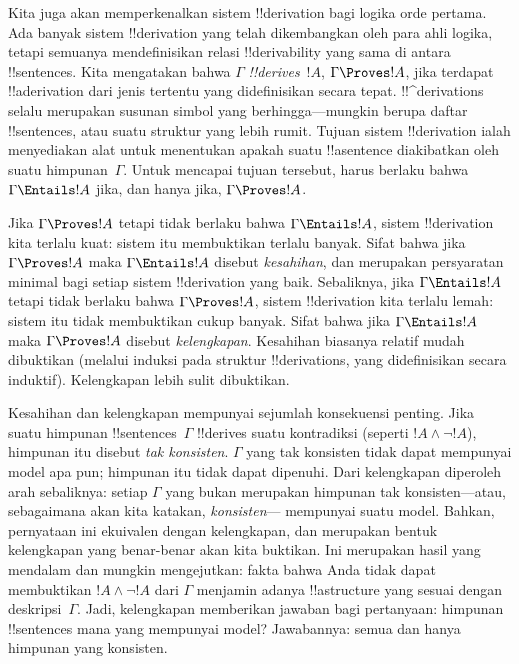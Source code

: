 \documentclass[../../../include/open-logic-section]{subfiles}
\begin{document}


Kita juga akan memperkenalkan sistem !!{derivation} bagi logika orde pertama.
Ada banyak sistem !!{derivation} yang telah dikembangkan oleh para ahli
logika, tetapi semuanya mendefinisikan relasi !!{derivability} yang sama di
antara !!{sentence}s. Kita mengatakan bahwa $\Gamma$ \emph{!!{derive}s}~$!A$,
$\Gamma \Proves !A$, jika terdapat !!a{derivation} dari jenis tertentu yang
didefinisikan secara tepat. !!^{derivation}s selalu merupakan susunan simbol
yang berhingga---mungkin berupa daftar !!{sentence}s, atau suatu struktur yang
lebih rumit. Tujuan sistem !!{derivation} ialah menyediakan alat untuk
menentukan apakah suatu !!a{sentence} diakibatkan oleh suatu himpunan~$\Gamma$.
Untuk mencapai tujuan tersebut, harus berlaku bahwa $\Gamma
\Entails !A$ jika, dan hanya jika, $\Gamma \Proves !A$.

Jika $\Gamma \Proves !A$ tetapi tidak berlaku bahwa $\Gamma \Entails !A$,
sistem !!{derivation} kita terlalu kuat: sistem itu membuktikan terlalu
banyak. Sifat bahwa jika $\Gamma \Proves !A$ maka $\Gamma \Entails !A$
disebut \emph{kesahihan}, dan merupakan persyaratan minimal bagi setiap sistem
!!{derivation} yang baik. Sebaliknya, jika $\Gamma \Entails !A$ tetapi tidak
berlaku bahwa $\Gamma \Proves !A$, sistem !!{derivation} kita terlalu lemah:
sistem itu tidak membuktikan cukup banyak. Sifat bahwa jika $\Gamma \Entails
!A$ maka $\Gamma \Proves !A$ disebut \emph{kelengkapan}. Kesahihan biasanya
relatif mudah dibuktikan (melalui induksi pada struktur !!{derivation}s, yang
didefinisikan secara induktif). Kelengkapan lebih sulit dibuktikan.

Kesahihan dan kelengkapan mempunyai sejumlah konsekuensi penting. Jika suatu
himpunan !!{sentence}s~$\Gamma$ !!{derive}s suatu kontradiksi (seperti $!A
\land \lnot !A$), himpunan itu disebut \emph{tak konsisten}. $\Gamma$ yang
tak konsisten tidak dapat mempunyai model apa pun; himpunan itu tidak dapat
dipenuhi. Dari kelengkapan diperoleh arah sebaliknya: setiap $\Gamma$ yang
bukan merupakan himpunan tak konsisten---atau, sebagaimana akan kita katakan,
\emph{konsisten}---
mempunyai suatu model. Bahkan, pernyataan ini ekuivalen dengan kelengkapan,
dan merupakan bentuk kelengkapan yang benar-benar akan kita buktikan. Ini
merupakan hasil yang mendalam dan mungkin mengejutkan: fakta bahwa Anda tidak
dapat membuktikan $!A \land \lnot !A$ dari $\Gamma$ menjamin adanya
!!a{structure} yang sesuai dengan deskripsi~$\Gamma$. Jadi, kelengkapan
memberikan jawaban bagi pertanyaan: himpunan !!{sentence}s mana yang mempunyai
model? Jawabannya: semua dan hanya himpunan yang konsisten.
\end{document}
